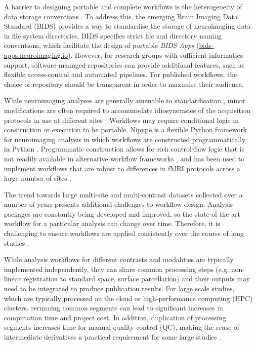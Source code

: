 \documentclass[smallextended]{svjour3}       %
\begin{document}
A barrier to designing portable and complete workflows is the
heterogeneity of data storage conventions \citep{marcus_extensible_2007,das_loris:_2012,gorgolewski_brain_2016}.
To address this, the emerging Brain
Imaging Data Standard (BIDS) \citep{gorgolewski_brain_2016} provides a way
to standardise the storage of neuroimaging data in file system
directories. BIDS specifies strict file and directory naming
conventions, which facilitate the design of portable \emph{BIDS Apps}
(\url{bids-apps.neuroimaging.io}). However, for research groups with
sufficient informatics support, software-managed repositories \citep{marcus_extensible_2007,das_loris:_2012}
can provide additional features, such as
flexible access-control and automated pipelines. For
published workflows, the choice of repository should be transparent in
order to maximise their audience.

While neuroimaging analyses are generally amenable to standardisation
\citep{kennedy_neuroimaging_2018}, minor modifications are often required to accommodate
idiosyncrasies of the acquisition protocols in use at different sites
\citep{esteban_fmriprep:_2018}. Workflows may require conditional
logic in construction or execution to be portable. Nipype is a flexible
Python framework for neuroimaging analysis in which workflows are
constructed programmatically in Python \citep{gorgolewski_nipype:_2011}.
Programmatic construction allows for rich control-flow logic that is not
readily available in alternative workflow frameworks \citep{cusack_automatic_2015,achterberg_fastr:_2016,amstutz_common_2016},
and has been used
to implement workflows that are robust to differences in fMRI protocols
across a large number of sites \citep{esteban_fmriprep:_2018}.

The trend towards large multi-site and multi-contrast datasets collected
over a number of years \citep{van_essen_human_2012,thompson_enigma_2014,sudlow_uk_2015}
presents additional challenges to workflow design.
Analysis packages are constantly being developed and improved, so the
state-of-the-art workflow for a particular analysis can change over
time. Therefore, it is challenging to ensure workflows are applied
consistently over the course of long studies \citep{cusack_automatic_2015}.

While analysis workflows for different contrasts and modalities are
typically implemented independently, they can share common processing
steps (e.g. non-linear registration to standard space, surface
parcellation) and their outputs may need to be integrated to produce
publication results. For large scale studies, which are typically
processed on the cloud or high-performance computing (HPC) clusters,
rerunning common segments can lead to significant increases in
computation time and project cost. In addition, duplication of
processing segments increases time for manual quality control (QC),
making the reuse of intermediate derivatives a practical requirement for
some large studies \citep{schreiber_using_2018}.
\end{document}
